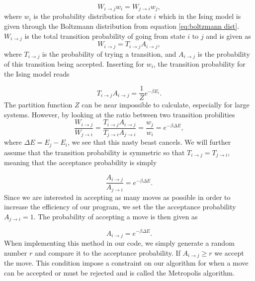 \documentclass[a4paper, 10pt, reqno]{amsart}
\begin{document}
\begin{equation}\label{eq: mark}
    W_{i \rightarrow j}w_i = W_{j \rightarrow i }w_j,
\end{equation}
where $w_i$ is the probability distribution for state $i$ which in the Ising model is given through the Boltzmann distribution from equation \eqref{eq:boltzmann dist}. $W_{i \rightarrow j}$ is the total transition probability of going from state $i$ to $j$ and is given as
\begin{equation}
    W_{i \rightarrow j} = T_{i \rightarrow j} A_{i \rightarrow j},
\end{equation} 
where $T_{i \rightarrow j}$ is the probability of trying a transition, and $A_{i \rightarrow j}$ is the probability of this transition being accepted. Inserting for $w_i$, the transition probability for the Ising model reads

\begin{equation}
    T_{i \rightarrow j} A_{i \rightarrow j} = \frac{1}{Z}e^{-\beta E_i}.
\end{equation}
The partition function $Z$ can be near impossible to calculate, especially for large systems. However, by looking at the ratio between two transition probilities
\begin{equation}\label{eq: mark ratio}
    \frac{ W_{i \rightarrow j}}{ W_{j \rightarrow i}}= \frac{T_{i \rightarrow j} A_{i \rightarrow j}}{ T_{j \rightarrow i} A_{j \rightarrow i}} = \frac{w_j}{w_i} = e^{-\beta\Delta E},
\end{equation}
where $\Delta E = E_j-E_i$, we see that this nasty beast cancels. We will further assume that the transition probability is symmetric so that $T_{i \rightarrow j} = T_{j \rightarrow i}$, meaning that the acceptance probability is simply

\begin{equation}
    \frac{A_{i \rightarrow j}}{A_{j \rightarrow i}} = e^{-\beta\Delta E}.
\end{equation}
Since we are interested in accepting as many moves as possible in order to increase the efficiency of our program, we set the the acceptance probability ${A_{j \rightarrow i}} = 1$. The probability of accepting a move is then given as

\begin{equation} \label{eq: A prob}
   A_{i \rightarrow j} =  e^{-\beta\Delta E}.
\end{equation}
When implementing this method in our code, we simply generate a random number $r$ and compare it to the acceptance probability. If $A_{i \rightarrow j} \geq r$ we accept the move. This condition impose a constraint on our algorithm for when a move can be accepted or must be rejected and is called the Metropolis algorithm.
\end{document}
